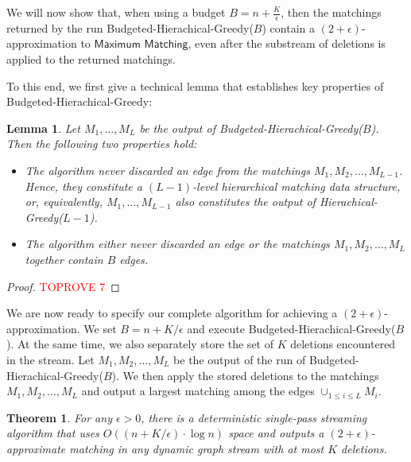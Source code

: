 \documentclass[11pt,a4paper]{article}
\newtheorem{theorem}{Theorem}
\newtheorem{lemma}{Lemma}
\begin{document}
We will now show that, when using a budget $B = n + \frac{K}{\epsilon}$, then the matchings returned by the run \textsf{Budgeted-Hierachical-Greedy($B$)} contain a $(2+\epsilon)$-approximation to $\textsf{Maximum Matching}$, even after the substream of deletions is applied to the returned matchings.

To this end, we first give a technical lemma that establishes key  properties of \textsf{Budgeted-Hierachical-Greedy}:

\begin{lemma} 
\label{lem:prefixHM}
Let $M_1, \dots, M_L$ be the output of \textsf{Budgeted-Hierachical-Greedy($B$)}. Then the following two properties hold:

\begin{itemize}
\item[($P_1$)]
The algorithm never discarded an edge from the matchings $M_1, M_2, \dots, M_{L-1}$. Hence, they constitute a $(L - 1)$-level hierarchical matching data structure, or, equivalently, $M_1, \dots, M_{L-1}$ also constitutes the output of \textsf{Hierachical-Greedy}($L-1$).

\item[($P_2$)]
The algorithm either never discarded an edge or the matchings $M_1, M_2, \dots, M_{L}$ together contain $B$ edges.
\end{itemize}
\end{lemma}

\begin{proof}\textcolor{red}{TOPROVE 7}\end{proof}

We are now ready to specify our complete algorithm for achieving a $(2+\epsilon)$-approximation. We set $B = n+K/\epsilon$ and execute \textsf{Budgeted-Hierachical-Greedy}($B$). At the same time, we also separately store the set of $K$ deletions encountered in the stream. Let $M_1, M_2, \dots, M_{L}$ be the output of the run of \textsf{Budgeted-Hierachical-Greedy}($B$). We then apply the stored deletions to the matchings $M_1, M_2, \dots, M_{L}$ and output a largest matching among the edges $\cup_{1 \le i \le L} M_i$.

\setcounter{thmsaved}{\value{theorem}}
\setcounter{theorem}{\value{counterUB2}}
\addtocounter{theorem}{-1}

\begin{theorem}
For any $\epsilon > 0$, there is a deterministic single-pass streaming algorithm that uses $O((n + K/\epsilon) \cdot \log n)$ space and outputs a $(2+\epsilon)$-approximate matching in any dynamic graph stream with at most $K$ deletions.
\end{theorem} 
\end{document}
